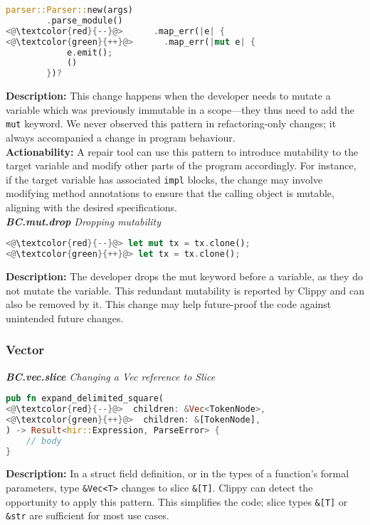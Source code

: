 \begin{lstlisting}[language=Rust, style=colouredRust]
parser::Parser::new(args)
        .parse_module()
<@\textcolor{red}{--}@>      .map_err(|e| {
<@\textcolor{green}{++}@>      .map_err(|mut e| {
            e.emit();
            ()
        })?
\end{lstlisting}

\noindent\textbf{Description:} This change happens when the developer needs to mutate a variable which was previously immutable in a scope---they thus need to add the \verb+mut+ keyword. We never observed this pattern in refactoring-only changes; it always accompanied a change in program behaviour. \\

\noindent\textbf{Actionability:} A repair tool can use this pattern to introduce mutability to the target variable and modify other parts of the program accordingly. For instance, if the target variable has associated \texttt{impl} blocks, the change may involve modifying method annotations to ensure that the calling object is mutable, aligning with the desired specifications. \\


\noindent\textit{\textbf{BC.mut.drop} Dropping mutability}

\begin{lstlisting}[language=Rust, style=colouredRust]
<@\textcolor{red}{--}@> let mut tx = tx.clone();
<@\textcolor{green}{++}@> let tx = tx.clone();
\end{lstlisting}

\noindent\textbf{Description:} The developer drops the mut keyword before a variable, as they do not mutate the variable. This redundant mutability is reported by Clippy and can also be removed by it. This change may help future-proof the code against unintended future changes.

\subsubsection{Vector}

\noindent\textit{\textbf{BC.vec.slice} Changing a Vec reference to Slice}

\begin{lstlisting}[language=Rust, style=colouredRust]
pub fn expand_delimited_square(
<@\textcolor{red}{--}@>  children: &Vec<TokenNode>,
<@\textcolor{green}{++}@>  children: &[TokenNode],
) -> Result<hir::Expression, ParseError> {
    // body
}
\end{lstlisting}
\noindent\textbf{Description:} In a struct field definition, or in the types of a function's formal parameters, type \verb+&Vec<T>+ changes to slice \verb+&[T]+. Clippy can detect the opportunity to apply this pattern. This simplifies the code; slice types \verb+&[T]+ or \verb+&str+ are sufficient for most use cases. 

